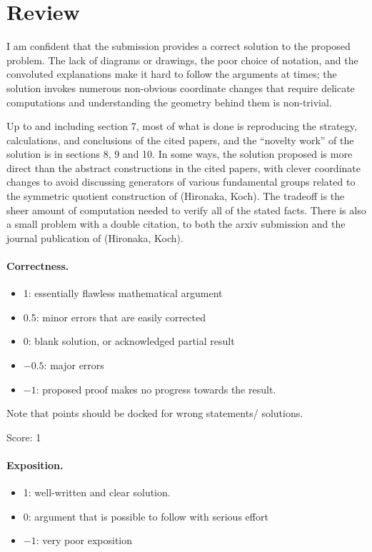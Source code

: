 \documentclass[11pt]{article}
\theoremstyle{remark}
\numberwithin{equation}{section}
\begin{document}
\maketitle

\section{Review}
I am confident that the submission provides a correct solution to the proposed problem. The lack of diagrams or drawings, the poor choice of notation, and the convoluted explanations make it hard to follow the arguments at times; the solution invokes numerous non-obvious coordinate changes that require delicate computations and understanding the geometry behind them is non-trivial.

Up to and including section 7, most of what is done is reproducing the strategy, calculations, and conclusions of the cited papers, and the ``novelty work'' of the solution is in sections 8, 9 and 10. In some ways, the solution proposed is more direct than the abstract constructions in the cited papers, with clever coordinate changes to avoid discussing generators of various fundamental groups related to the symmetric quotient construction of (Hironaka, Koch). The tradeoff is the sheer amount of computation needed to verify all of the stated facts. There is also a small problem with a double citation, to both the arxiv submission and the journal publication of (Hironaka, Koch).

\paragraph{Correctness.}
\begin{itemize}
	\item  1: essentially flawless mathematical argument
	\item  0.5: minor errors that are easily corrected
	\item  0: blank solution, or acknowledged partial result
	\item  $-0.5$: major errors
	\item  $-1$: proposed proof makes no progress towards the result.
\end{itemize}
Note that points should be docked for wrong statements/ solutions.

\noindent Score: 1

\paragraph{Exposition.}
\begin{itemize}
	\item  1: well-written and clear solution.
	\item  0: argument that is possible to follow with serious effort
	\item  $-1$: very poor exposition
\end{itemize}
\end{document}

